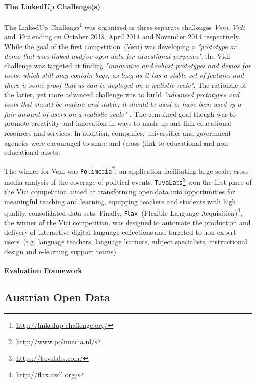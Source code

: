 \documentclass{article}
\begin{document}
\paragraph{The LinkedUp Challenge(s)}
The LinkedUp Challenge\footnote{\url{http://linkedup-challenge.org/}} was organized as three separate challenges \textit{Veni}, \textit{Vidi} and \textit{Vici} ending on October 2013, April 2014 and November 2014 respectively. While the goal of the first competition~(Veni) was developing a \textit{"prototype or demo that uses linked and/or open data for educational purposes"}, the Vidi challenge was targeted at finding \textit{"innovative and robust prototypes and demos for tools, which still may contain bugs, as long as it has a stable set of features and there is some proof that us can be deployed on a realistic scale"}. The rationale of the latter, yet more advanced challenge was to build \textit{"advanced prototypes and tools that should be mature and stable; it should be used or have been used by a fair amount of users on a realistic scale"}~\cite{url:linkedup_lnikedup_challenge_results}. 
The combined goal though was to promote creativity and innovation in ways to mash-up and link educational resources and services. In addition, companies, universities and government agencies were encouraged to share and (cross-)link to educational and non-educational assets. 

The winner for Veni was \texttt{Polimedia}\footnote{\url{http://www.polimedia.nl/}}, an application facilitating large-scale, cross-media analysis of the coverage of political events.
\texttt{TuvaLabs}\footnote{\url{https://tuvalabs.com/}} won the first place of the Vidi competition aimed at transforming open data into opportunities for meaningful teaching and learning, equipping teachers and students with high quality, consolidated data sets. Finally, \texttt{Flax}~(Flexible Language Acquisition)\footnote{\url{http://flax.nzdl.org/}},
the winner of the Vici competition, was designed to automate the production and delivery of interactive digital language collections and targeted to non-expert users~(e.g. language teachers, language learners, subject specialists, instructional design and e-learning support teams). 

\paragraph{Evaluation Framework}

 
\subsection{Austrian Open Data}
\label{sec:austrian_open_data}
\end{document}
